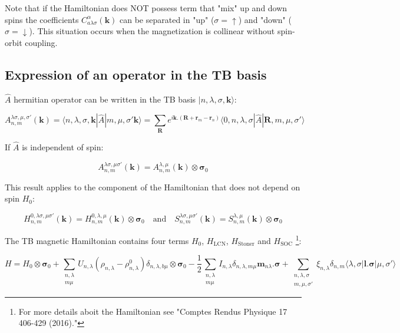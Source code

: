 \documentclass{article}
\newcommand{\bra}[1]{\langle #1|}
\newcommand{\ket}[1]{|#1\rangle}
\newcommand{\op}[1]{\hat{#1}}
\begin{document}
\noindent
Note that if the Hamiltonian does NOT possess term that "mix" up and down spins the coefficients $C_{a \lambda \sigma}^{\alpha}(\mathbf{k})$ can be separated in "up" ($\sigma=\uparrow $) and "down" ($\sigma=\downarrow $). This situation occurs when the magnetization is collinear without spin-orbit coupling.


\subsection{Expression of an operator in the TB basis}


\noindent $\op{A}$ hermitian operator
can be written in the TB basis $\ket{n,\lambda,\sigma,\mathbf{k}}$:

\[\displaystyle A_{n,m}^{\lambda \sigma,\mu, \sigma'}(\mathbf{k})=
\bra{n,\lambda,\sigma,\mathbf{k}}\op{A}\ket{m,\mu,
\sigma'\mathbf{k}}= \sum_{\mathbf{R}}
e^{i\mathbf{k}.(\mathbf{R}+\mathbf{r}_{m}-\mathbf{r}_n)} \bra{0,n,\lambda,\sigma }
 \op{A} \ket{\mathbf{R},m,\mu,\sigma'} \]

\noindent
If $\op{A}$ is independent of spin:

\[ \displaystyle A_{n,m}^{\lambda \sigma,\mu 
\sigma'}(\mathbf{k})= A_{n,m}^{\lambda,\mu}(\mathbf{k}) \otimes \bm{\sigma}_0 \]

\noindent
This result applies to the component of the Hamiltonian that does not depend on spin $H_0$:

\[ H_{n,m}^{0,\lambda \sigma, \mu \sigma'} (\mathbf{k}) 
=H_{n,m}^{0, \lambda, \mu} (\mathbf{k}) \otimes \bm{\sigma}_0
\quad \text{and} \quad
S_{n,m}^{\lambda \sigma, \mu \sigma'} (\mathbf{k}) 
=S_{n,m}^{\lambda, \mu} (\mathbf{k}) \otimes \bm{\sigma}_0
\]

\noindent The TB magnetic Hamiltonian contains four terms $H_0$, $H_{\text{LCN}}$, $H_{\text{Stoner}}$ and $H_{\text{SOC}}$ \footnote{\noindent For more details aboit the Hamiltonian see "Comptes Rendus Physique 17 406-429 (2016)."}:


\[\displaystyle H=H_0\otimes\bm{\sigma}_0
+\sum_{\substack{n,\lambda\\m \mu} } U_{n,\lambda}
(\rho_{n,\lambda}-\rho_{n,\lambda}^0) \delta_{n,\lambda,b \mu
}\otimes\bm{\sigma}_0 -\frac{1}{2}\sum_{\substack{n,\lambda\\m \mu}} I_{n,\lambda} \delta_{n,\lambda,m \mu } \mathbf{m}_{n \lambda}.\bm{\sigma}  
+ \sum_{\substack{n,\lambda, \sigma\\ m, \mu, \sigma'} } \xi_{n,\lambda} \delta_{n,m} 
\bra{\lambda,\sigma} \mathbf{l}.\mathbf{\sigma}\ket{\mu,\sigma'}
\]
\end{document}
